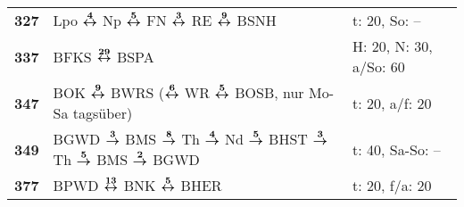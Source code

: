 \begin{minipage}[t]{0.45\textwidth}
\begin{tabular}{>{\bfseries}L{1.2cm}L{9.0cm}L{3.0cm}}
\bus{} 327    & Lpo $\boldsymbol{\overset{4}{\leftrightarrow}}$ Np $\boldsymbol{\overset{5}{\leftrightarrow}}$ FN $\boldsymbol{\overset{3}{\leftrightarrow}}$ RE $\boldsymbol{\overset{9}{\leftrightarrow}}$ BSNH                                                                                                   & t: 20, So: --              \\
\bus{} 337    & BFKS $\boldsymbol{\overset{29}{\leftrightarrow}}$ BSPA                                                                                                                                              & H: 20, N: 30, a/So: 60     \\
\bus{} 347    & BOK $\boldsymbol{\overset{9}{\leftrightarrow}}$ BWRS ($\boldsymbol{\overset{6}{\leftrightarrow}}$ WR $\boldsymbol{\overset{5}{\leftrightarrow}}$ BOSB, nur Mo-Sa tagsüber)                                                                                          & t: 20, a/f: 20             \\
\bus{} 349    & BGWD $\boldsymbol{\overset{3}{\rightarrow}}$ BMS $\boldsymbol{\overset{8}{\rightarrow}}$ Th $\boldsymbol{\overset{4}{\rightarrow}}$ Nd $\boldsymbol{\overset{5}{\rightarrow}}$ BHST $\boldsymbol{\overset{3}{\rightarrow}}$ Th $\boldsymbol{\overset{5}{\rightarrow}}$ BMS $\boldsymbol{\overset{2}{\rightarrow}}$ BGWD
& t: 40, Sa-So: --           \\
\bus{} 377    & BPWD $\boldsymbol{\overset{13}{\leftrightarrow}}$ BNK $\boldsymbol{\overset{5}{\leftrightarrow}}$ BHER                                                                                                                              & t: 20, f/a: 20             \\
\hline
\end{tabular}
\end{minipage}
